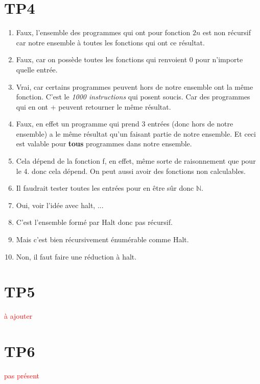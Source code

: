 \documentclass{report}
\begin{document}
\section{TP4}
\begin{enumerate}
\item Faux, l'ensemble des programmes qui ont pour fonction $2n$ est non récursif car notre ensemble à toutes les fonctions qui ont ce résultat.
\item Faux, car on possède toutes les fonctions qui renvoient $0$ pour n'importe quelle entrée.
\item Vrai, car certains programmes peuvent hors de notre ensemble ont la même fonction. C'est le \textit{1000 instructions} qui posent soucis. Car des programmes qui en ont + peuvent retourner le même résultat.
\item Faux, en effet un programme qui prend 3 entrées (donc hors de notre ensemble) a le même résultat qu'un faisant partie de notre ensemble. Et ceci est valable pour \textbf{tous} programmes dans notre ensemble.
\item Cela dépend de la fonction f, en effet, même sorte de raisonnement que pour le 4. donc cela dépend. On peut aussi avoir des fonctions non calculables.
\item Il faudrait tester toutes les entrées pour en être sûr donc $\mathbb{N}$.
\item Oui, voir l'idée avec halt, ...
\item C'est l'ensemble formé par Halt donc pas récursif.
\item Mais c'est bien récursivement énumérable comme Halt.
\item Non, il faut faire une réduction à halt.
\end{enumerate}

\section{TP5}
\textcolor{red}{à ajouter}

\section{TP6}
\textcolor{red}{pas présent}
\end{document}
